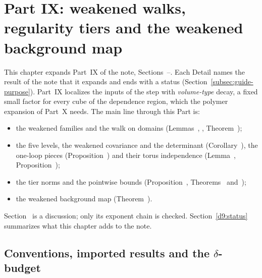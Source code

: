 \section{Part IX: weakened walks, regularity tiers and the weakened background map}\label{d9:sec}

This chapter expands Part~IX of the note, Sections~--. Each Detail names the result of the note that it expands and ends with a status (Section~\ref{subsec:guide-purpose}). Part~IX localizes the inputs of the step with \emph{volume-type} decay, a fixed small factor for every cube of the dependence region, which the polymer expansion of Part~X needs. The main line through this Part is:
\begin{itemize}
\item the weakened families and the walk on domains (Lemmas~, , Theorem~);
\item the five levels, the weakened covariance and the determinant (Corollary~), the one-loop pieces (Proposition~) and their torus independence (Lemma~, Proposition~);
\item the tier norms and the pointwise bounds (Proposition~, Theorems~ and~);
\item the weakened background map (Theorem~).
\end{itemize}
Section~ is a discussion; only its exponent chain is checked. Section~\ref{d9:status} summarizes what this chapter adds to the note.

\subsection{Conventions, imported results and the \texorpdfstring{$\delta$}{delta}-budget}\label{d9:conv}

